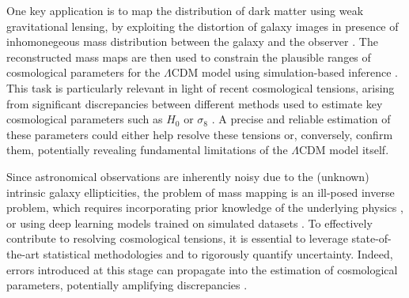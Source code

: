 \documentclass{aa}
\begin{document}
One key application is to map the distribution of dark matter using weak gravitational lensing, by exploiting the distortion of galaxy images in presence of inhomonegeous mass distribution between the galaxy and the observer \citep{Kaiser1993}.
The reconstructed mass maps are then used to constrain the plausible ranges of cosmological parameters for the $\Lambda$CDM model using simulation-based inference \tocheck\addref {}.   This task is particularly relevant in light of recent cosmological tensions, arising from significant discrepancies between different methods used to estimate key cosmological parameters such as $H_0$ \citep{Valentino2021} or $\sigma_8$ \citep{Asgari2021, Heymans2021}. 
A precise and reliable estimation of these parameters could either help resolve these tensions or, conversely, confirm them, potentially revealing fundamental limitations of the $\Lambda$CDM model itself.

Since astronomical observations are inherently noisy due to the (unknown) intrinsic galaxy ellipticities, the problem of mass mapping is an ill-posed inverse problem, which requires incorporating prior knowledge of the underlying physics \citep{Lanusse2016,Starck2021}, or using deep learning models trained on simulated datasets \citep{Jeffrey2020,Remy2023,Whitney2024}. To effectively contribute to resolving cosmological tensions, it is essential to leverage state-of-the-art statistical methodologies and to rigorously quantify uncertainty. Indeed, errors introduced at this stage can propagate into the estimation of cosmological parameters, potentially amplifying discrepancies \citep{Tersenov2025}. 
\end{document}
